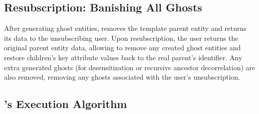 \subsection{Resubscription: Banishing All Ghosts}
After generating ghost entities, \sys removes the template parent entity and returns its data to the
unsubscribing user. Upon resubscription, the user returns the original parent entity data, allowing
\sys to remove any created ghost entities and restore children's key attribute values back to the
real parent's identifier.
Any extra generated ghosts (for desensitization or recursive ancestor decorrelation) are also
removed, removing any ghosts associated with the user's unsubscription.

        
\subsection{\sys's Execution Algorithm}


